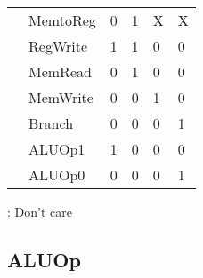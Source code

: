 \begin{multicols*}{3}
\begin{footnotesize}
\begin{tabularx}{\linewidth}{@{}T T Z Z Z Z @{}}
                                                                  & MemtoReg    & 0        & 1  & X  & X   \\
                                                                  & RegWrite    & 1        & 1  & 0  & 0   \\
                                                                  & MemRead     & 0        & 1  & 0  & 0   \\
                                                                  & MemWrite    & 0        & 0  & 1  & 0   \\
                                                                  & Branch      & 0        & 0  & 0  & 1   \\
                                                                  & ALUOp1      & 1        & 0  & 0  & 0   \\
                                                                  & ALUOp0      & 0        & 0  & 0  & 1   \\
        \end{tabularx}
        \renewcommand{\arraystretch}{1}
        \setlength{\tabcolsep}{\oldtabcolsep}
    \end{footnotesize}
    : Don't care

    \subsection{ALUOp}


\end{multicols*}
